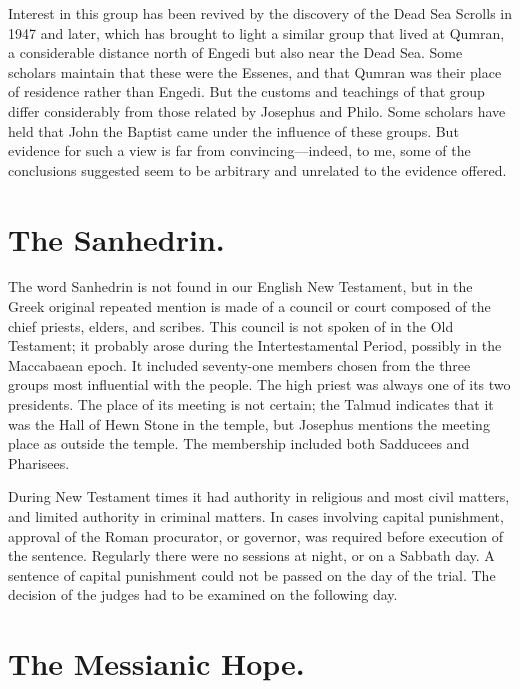 Interest in this group has been revived by the discovery of the Dead Sea Scrolls in 1947 and later, which has brought to light a similar group that lived at Qumran, a considerable distance north of Engedi but also near the Dead Sea. Some scholars maintain that these were the Essenes, and that Qumran was their place of residence rather than Engedi. But the customs and teachings of that group differ considerably from those related by Josephus and Philo. Some scholars have held that John the Baptist came under the influence of these groups. But evidence for such a view is far from convincing---indeed, to me, some of the conclusions suggested seem to be arbitrary and unrelated to the evidence offered.

\section{The Sanhedrin.}

The word Sanhedrin is not found in our English New Testament, but in the Greek original repeated mention is made of a council or court composed of the chief priests, elders, and scribes. This council is not spoken of in the Old Testament; it probably arose during the Intertestamental Period, possibly in the Maccabaean epoch. It included seventy-one members chosen from the three groups most influential with the people. The high priest was always one of its two presidents. The place of its meeting is not certain; the Talmud indicates that it was the Hall of Hewn Stone in the temple, but Josephus mentions the meeting place as outside the temple. The membership included both Sadducees and Pharisees.

During New Testament times it had authority in religious and most civil matters, and limited authority in criminal matters. In cases involving capital punishment, approval of the Roman procurator, or governor, was required before execution of the sentence. Regularly there were no sessions at night, or on a Sabbath day. A sentence of capital punishment could not be passed on the day of the trial. The decision of the judges had to be examined on the following day.

\section{The Messianic Hope.}

